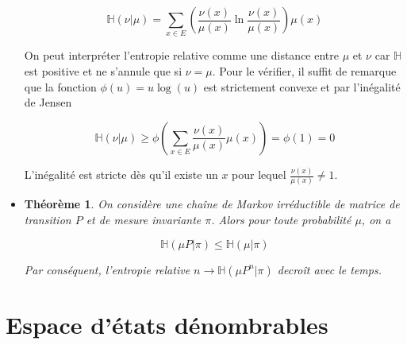 \documentclass[10pt,a4paper,oneside]{article}
\newtheorem{theoreme}{Théorème}
\begin{document}
\begin{itemize}
\[ \mathbb{H}(\nu | \mu) = \sum_{x \in E} \left( \frac{\nu(x)}{\mu(x)} \ln \frac{\nu(x)}{\mu(x)} \right) \mu(x) \]

On peut interpréter l'entropie relative comme une distance entre $\mu$ et $\nu$ car $\mathbb{H}$ est positive et ne s'annule que si $\nu = \mu$. Pour le vérifier, il suffit de remarque que la fonction $\phi(u) = u\log(u)$ est strictement convexe et par l'inégalité de Jensen

\[ \mathbb{H}(\nu | \mu) \geq \phi \left( \sum_{x \in E} \frac{\nu(x)}{\mu(x)}\mu(x) \right) = \phi(1) = 0 \]

L'inégalité est stricte dès qu'il existe un $x$ pour lequel $\frac{\nu(x)}{\mu(x)} \neq 1$.

\item
\begin{theoreme}
On considère une chaîne de Markov irréductible de matrice de transition $P$ et de mesure invariante $\pi$. Alors pour toute probabilité $\mu$, on a

\[ \mathbb{H}(\mu P | \pi) \leq \mathbb{H}(\mu | \pi) \]

Par conséquent, l'entropie relative $n \to \mathbb{H}(\mu P^n | \pi)$ decroît avec le temps.
\end{theoreme}

\end{itemize}

\section{Espace d'états dénombrables}
\end{document}
